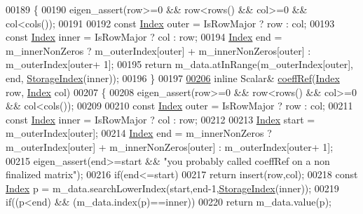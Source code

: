 \begin{DoxyCode}
00189 \textcolor{keyword}{    }\{
00190       eigen\_assert(row>=0 && row<rows() && col>=0 && col<cols());
00191       
00192       \textcolor{keyword}{const} \hyperlink{group___core___module_a554f30542cc2316add4b1ea0a492ff02}{Index} outer = IsRowMajor ? row : col;
00193       \textcolor{keyword}{const} \hyperlink{group___core___module_a554f30542cc2316add4b1ea0a492ff02}{Index} inner = IsRowMajor ? col : row;
00194       \hyperlink{group___core___module_a554f30542cc2316add4b1ea0a492ff02}{Index} end = m\_innerNonZeros ? m\_outerIndex[outer] + m\_innerNonZeros[outer] : m\_outerIndex[outer+
      1];
00195       \textcolor{keywordflow}{return} m\_data.atInRange(m\_outerIndex[outer], end, \hyperlink{group___sparse_core___module_a0b540ba724726ebe953f8c0df06081ed}{StorageIndex}(inner));
00196     \}
00197 
\hyperlink{group___sparse_core___module_a013197b3f598968ff37ed8c97087f1ef}{00206}     \textcolor{keyword}{inline} Scalar& \hyperlink{group___sparse_core___module_a013197b3f598968ff37ed8c97087f1ef}{coeffRef}(\hyperlink{group___core___module_a554f30542cc2316add4b1ea0a492ff02}{Index} row, \hyperlink{group___core___module_a554f30542cc2316add4b1ea0a492ff02}{Index} col)
00207     \{
00208       eigen\_assert(row>=0 && row<rows() && col>=0 && col<cols());
00209       
00210       \textcolor{keyword}{const} \hyperlink{group___core___module_a554f30542cc2316add4b1ea0a492ff02}{Index} outer = IsRowMajor ? row : col;
00211       \textcolor{keyword}{const} \hyperlink{group___core___module_a554f30542cc2316add4b1ea0a492ff02}{Index} inner = IsRowMajor ? col : row;
00212 
00213       \hyperlink{group___core___module_a554f30542cc2316add4b1ea0a492ff02}{Index} start = m\_outerIndex[outer];
00214       \hyperlink{group___core___module_a554f30542cc2316add4b1ea0a492ff02}{Index} end = m\_innerNonZeros ? m\_outerIndex[outer] + m\_innerNonZeros[outer] : m\_outerIndex[outer+
      1];
00215       eigen\_assert(end>=start && \textcolor{stringliteral}{"you probably called coeffRef on a non finalized matrix"});
00216       \textcolor{keywordflow}{if}(end<=start)
00217         \textcolor{keywordflow}{return} insert(row,col);
00218       \textcolor{keyword}{const} \hyperlink{group___core___module_a554f30542cc2316add4b1ea0a492ff02}{Index} p = m\_data.searchLowerIndex(start,end-1,\hyperlink{group___sparse_core___module_a0b540ba724726ebe953f8c0df06081ed}{StorageIndex}(inner));
00219       \textcolor{keywordflow}{if}((p<end) && (m\_data.index(p)==inner))
00220         \textcolor{keywordflow}{return} m\_data.value(p);

\end{DoxyCode}
